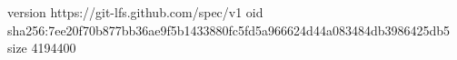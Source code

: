 version https://git-lfs.github.com/spec/v1
oid sha256:7ee20f70b877bb36ae9f5b1433880fc5fd5a966624d44a083484db3986425db5
size 4194400
